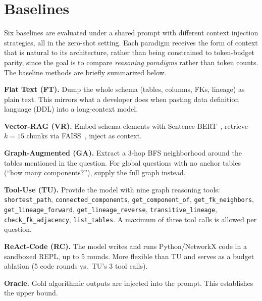 \section{Baselines}
\label{sec:baselines}

Six baselines are evaluated under a shared prompt with different context injection strategies, all in the zero-shot setting. Each paradigm receives the form of context that is natural to its architecture, rather than being constrained to token-budget parity, since the goal is to compare \emph{reasoning paradigms} rather than token counts. The baseline methods are briefly summarized below.

\textbf{Flat Text (FT).}  Dump the whole schema (tables, columns, FKs,
lineage) as plain text.  This mirrors what a developer does when pasting
data definition language (DDL) into a long-context model.

\textbf{Vector-RAG (VR).}  Embed schema elements with
Sentence-BERT~\cite{reimers2019sentencebert}, retrieve $k{=}15$ chunks via
FAISS~\cite{faiss2019}, inject as context.

\textbf{Graph-Augmented (GA).}  Extract a 3-hop BFS neighborhood around the
tables mentioned in the question.  For global questions with no anchor
tables (``how many components?''), supply the full graph instead.

\textbf{Tool-Use (TU).}  Provide the model with nine graph reasoning tools:
\texttt{shortest\_path}, \texttt{connected\_\allowbreak{}components},
\texttt{get\_component\_of}, \texttt{get\_fk\_\allowbreak{}neighbors},
\texttt{get\_lineage\_forward}, \texttt{get\_lineage\_\allowbreak{}reverse},
\texttt{transitive\_lineage}, \texttt{check\_fk\_\allowbreak{}adjacency},
\texttt{list\_tables}. A maximum of three tool calls is allowed per question.

\textbf{ReAct-Code (RC).}  The model writes and runs Python/NetworkX code
in a sandboxed REPL, up to 5 rounds.  More flexible than TU and serves as
a budget ablation (5 code rounds vs.\ TU's 3 tool calls).

\textbf{Oracle.}  Gold algorithmic outputs are injected into the prompt.  This
establishes the upper bound.
